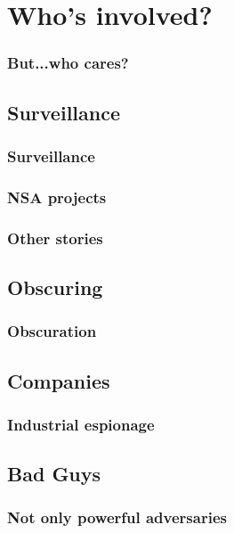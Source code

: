\section{Who's involved?}
\begin{frame}
	\frametitle{But...who cares?}
\end{frame}

\subsection{Surveillance} 
\begin{frame}
	\frametitle{Surveillance}
\end{frame}

\begin{frame}
	\frametitle{NSA projects}
\end{frame}

\begin{frame}
	\frametitle{Other stories}

\end{frame}

\subsection{Obscuring}
\begin{frame}
	\frametitle{Obscuration}
\end{frame}

\subsection{Companies} %
\begin{frame}
	\frametitle{Industrial espionage}
\end{frame}

\subsection{Bad Guys}
\begin{frame}
	\frametitle{Not only powerful adversaries}
\end{frame}
